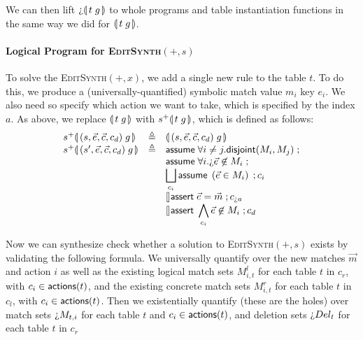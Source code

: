 We can then lift $\hole\parenbb{t\; g}$ to whole programs and table
instantiation functions in the same way we did for $\llparenthesis\, t\; g\, \rrparenthesis$.



\paragraph{Logical Program for \textsc{EditSynth}$(+,s)$}

To solve the \textsc{EditSynth}$(+,x)$, we add a single new rule to the table
$t$. To do this, we produce a (universally-quantified) symbolic match value
$m_i$ key $e_i$. We also need so specify which action we want to take, which is
specified by the index $a$. As above, we replace $\llparenthesis\, t\;g\, \rrparenthesis$ with
$s^+\llparenthesis\, t\; g\, \rrparenthesis$, which is defined as follows:
\[\begin{array}{lcl}
    s^+\parenbb{(s,\vec e, \vec c, c_d) \; g}
    &\triangleq
    & \parenbb{(s,\vec e, \vec c, c_d) \; g} \\
    s^+\parenbb{(s',\vec e, \vec c, c_d) \; g}
    &\triangleq
    & \assume{\forall i\neq j. \mathsf{disjoint}(M_i,M_j)}; \\
    && \assume{\forall i. \hole{\vec e} \not\in M_i};\\
    && \displaystyle \Angel_{c_i}
       \assume{\left(\vec e \in M_i\right)}; c_i\\
    && \displaystyle \angel \assert{\vec e = \vec m}; c_{\hole a}\\
    && \displaystyle \angel \assert{\bigwedge_{c_i} \vec e \not\in M_i}; c_d
\end{array}\]

Now we can synthesize check whether a solution to \textsc{EditSynth}$(+,s)$
exists by validating the following formula. We universally quantify over the new
matches $\vec m$ and action $i$ as well as the existing logical match sets
$M^l_{i,t}$ for each table $t$ in $c_r$, with $c_i \in \mathsf{actions}(t)$, and the
existing concrete match sets $M^r_{i,t}$ for each table $t$ in $c_l$, with
$c_i \in \mathsf{actions}(t)$. Then we existentially quantify (these are the holes) over
match sets $\hole{M_{t,i}}$ for each table $t$ and $c_i \in \mathsf{actions}(t)$, and
deletion sets $\hole{Del_t}$ for each table $t$ in $c_r$

